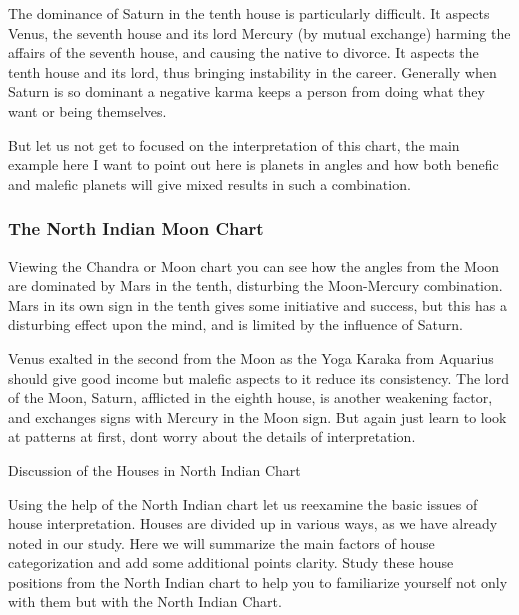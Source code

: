  

The dominance of Saturn in the tenth house is particularly difficult. It aspects Venus, the seventh house and its lord Mercury (by mutual exchange) harming the affairs of the seventh house, and causing the native to divorce. It aspects the tenth house and its lord, thus bringing instability in the career. Generally when Saturn is so dominant a negative karma keeps a person from doing what they want or being themselves.

 

But let us not get to focused on the interpretation of this chart, the main example here I want to point out here is planets in angles and how both benefic and malefic planets will give mixed results in such a combination.

 

\subsubsection{The North Indian Moon Chart}

 

Viewing the Chandra or Moon chart you can see how the angles from the Moon are dominated by Mars in the tenth, disturbing the Moon-Mercury combination. Mars in its own sign in the tenth gives some initiative and success, but this has a disturbing effect upon the mind, and is limited by the influence of Saturn.

 

Venus exalted in the second from the Moon as the Yoga Karaka from Aquarius should give good income but malefic aspects to it reduce its consistency. The lord of the Moon, Saturn, afflicted in the eighth house, is another weakening factor, and exchanges signs with Mercury in the Moon sign. But again just learn to look at patterns at first, dont worry about the details of interpretation.

 

Discussion of the Houses in North Indian Chart
 

Using the help of the North Indian chart let us reexamine the basic issues of house interpretation. Houses are divided up in various ways, as we have already noted in our study. Here we will summarize the main factors of house categorization and add some additional points clarity. Study these house positions from the North Indian chart to help you to familiarize yourself not only with them but with the North Indian Chart.

 

